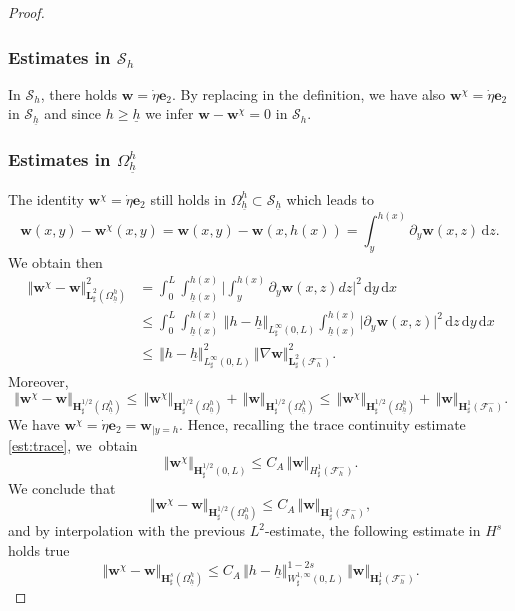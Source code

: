 \documentclass[11pt]{article}
\let\mathcal\mathscr
\theoremstyle{remark}
\theoremstyle{definition}
\newcommand{\norme}[1]{\,\Vert #1\Vert}
\newcommand{\dd}{\,\mathrm{d}}
\newcommand{\wg}{\boldsymbol{w}}
\newcommand{\BS}[1]{\boldsymbol{#1}}
\newcommand{\etap}{\dot{\eta}}
\newcommand{\hb}{{\underline{h}}}
\begin{document}
\begin{proof}
\subsubsection*{Estimates in $\mathcal{S}_{h}$}
In $\mathcal{S}_{h}$, there holds $\wg=\etap \BS{e}_2$. By replacing in the definition, we have also $\wg^\chi = \etap\BS{e}_2$ in $\mathcal{S}_{\hb}$ and since $h\geq \hb$ we infer $\wg - \wg^{\chi} = 0$ in $\mathcal{S}_{h}$.

\subsubsection*{Estimates in $\Omega^{h}_{\hb}$}
The identity $\wg^\chi=\etap\BS{e}_{2}$ still holds in $\Omega^{h}_{\hb} \subset \mathcal S_{\hb}$ which leads to
\[\wg(x,y)- \wg^{\chi}(x,y) = \wg(x,y) - \wg(x,h(x)) =\int_{y}^{h(x)}\partial_y\wg(x,z)\dd z.\]
We obtain then
\[
\begin{aligned}
\norme{\wg^\chi - \wg}_{\BS{L}^{2}_{\sharp}(\Omega_{\hb}^{h})}^{2}&{}=\int_{0}^{L}\int_{\hb(x)}^{h(x)}\biggl\vert \int_{y}^{h(x)}\partial_y\wg(x,z)dz\biggl\vert^{2}\dd y\dd x\\
&\leq \int_{0}^{L}\int_{\hb(x)}^{h(x)}\norme{h-\hb}_{L^{\infty}_{\sharp}(0,L)}\int_{\hb(x)}^{h(x)}\vert\partial_y\wg(x,z)\vert^{2}\dd z\dd y\dd x\\
&\leq \norme{h-\hb}_{L^{\infty}_{\sharp}(0,L)}^{2}\norme{\nabla\wg}_{\BS{L}^{2}_{\sharp}(\mathcal{F}^{-}_{h})}^{2}.
\end{aligned}
\]
Moreover,
\[\norme{\wg^\chi-\wg}_{\BS{H}^{1/2}_{\sharp}(\Omega_{\hb}^{h})}\leq \norme{\wg^\chi}_{\BS{H}^{1/2}_{\sharp}(\Omega_{\hb}^{h})} + \norme{\wg}_{\BS{H}^{1/2}_{\sharp}(\Omega_{\hb}^{h})}\leq \norme{\wg^\chi}_{\BS{H}^{1/2}_{\sharp}(\Omega_{\hb}^{h})} + \norme{\wg}_{\BS{H}^{1}_{\sharp}(\mathcal{F}^{-}_{h})}.
\]
We have
$\wg^\chi=\etap\BS{e}_2=\wg_{|{y=h}}$. Hence,
recalling the trace continuity estimate \eqref{est:trace}, we~obtain
\[
\norme{\wg^\chi}_{\BS{H}^{1/2}_{\sharp}(0,L)} \leq C_A\norme{\wg}_{H^{1}_{\sharp}(\mathcal{F}^{-}_{h})}.
\]
We conclude that
\[\norme{\wg^\chi-\wg}_{\BS{H}^{1/2}_{\sharp}(\Omega_{\hb}^{h})}\leq C_A\norme{\wg}_{\BS{H}^{1}_{\sharp}(\mathcal{F}^{-}_{h})},\]
and by interpolation with the previous $L^2$-estimate, the following estimate in $H^s$ holds true
\begin{equation} \label{eq_enhaut}
\norme{\wg^\chi-\wg}_{\BS{H}^{s}_{\sharp}(\Omega^{h}_{\hb})}\leq C_A\norme{h-\hb}_{W^{1,\infty}_{\sharp}(0,L)}^{1-2s}\norme{\wg}_{\BS{H}^{1}_{\sharp}(\mathcal{F}^{-}_{h})}.
\end{equation}


\end{proof}
\end{document}
